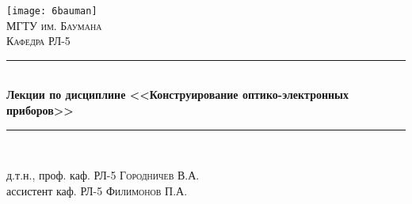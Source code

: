 \begin{titlepage}

\newcommand{\HRule}{\rule{\linewidth}{0.5mm}} %

\center %
 

\texttt{[image: 6bauman]}\\[1cm] %



\textsc{\LARGE МГТУ им. Баумана}\\[1.5cm] %
\textsc{\Large Кафедра РЛ-5}\\[0.5cm] %


\HRule \\[0.4cm]
{ \huge \bfseries Лекции по дисциплине <<Конструирование оптико-электронных приборов>>}\\[0.4cm] %
\HRule \\[1.5cm]
 

\begin{minipage}{1\textwidth}
\begin{flushright} \large
д.т.н., проф. каф. РЛ-5 \textsc{Городничев} В.А. \\ %
ассистент каф. РЛ-5 \textsc{Филимонов} П.А.
\end{flushright}
\end{minipage}


\end{titlepage}
